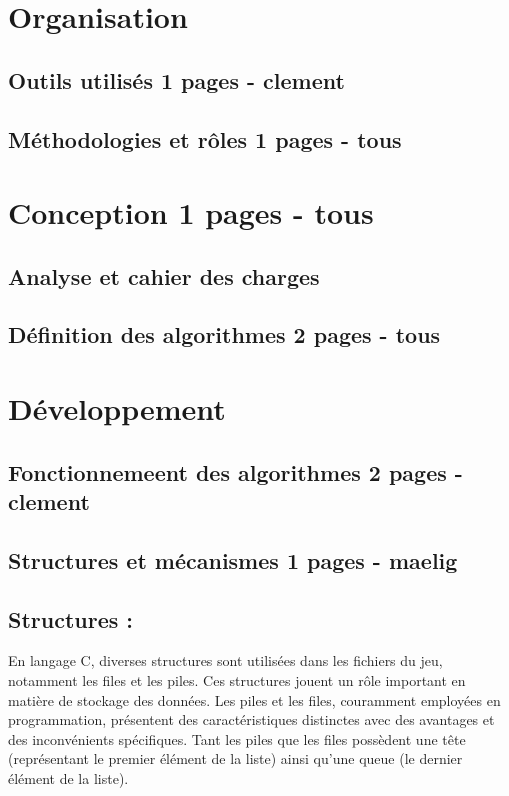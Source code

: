 \documentclass[10pt]{article}
\begin{document}
\section{Organisation}   
   \subsection{Outils utilisés 1 pages - clement}
   \subsection{Méthodologies et rôles 1 pages - tous}

\section{Conception 1 pages - tous}
   \subsection{Analyse et cahier des charges}
   \subsection{Définition des algorithmes 2 pages - tous}

\section{Développement}
   \subsection{Fonctionnemeent des algorithmes 2 pages - clement}
   \subsection{Structures et mécanismes 1 pages - maelig}
   \subsection{Structures :}

   En langage C, diverses structures sont utilisées dans les fichiers du jeu, notamment les files et les piles. 
   Ces structures jouent un rôle important en matière de stockage des données. Les piles et les files, couramment employées en programmation, 
   présentent des caractéristiques distinctes avec des avantages et des inconvénients spécifiques. Tant les piles que les files possèdent une tête 
   (représentant le premier élément de la liste) ainsi qu'une queue (le dernier élément de la liste).
\end{document}
